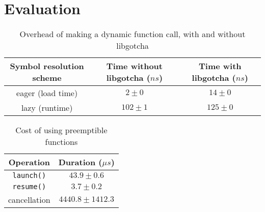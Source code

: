 \section{Evaluation}
\label{sec:eval}

\begin{table*}
\begin{center}
\begin{tabular}{c | c c}
Symbol resolution scheme & Time without libgotcha ($ns$) & Time with libgotcha ($ns$) \\
\hline
eager (load time) & $2 \pm 0$ & $14 \pm 0$ \\
lazy (runtime) & $102 \pm 1$ & $125 \pm 0$
\end{tabular}
\end{center}
\caption{Overhead of making a dynamic function call, with and without libgotcha}
\end{table*}


\begin{table}
\begin{center}
\begin{tabular}{c | c}
Operation & Duration ($\mu{s}$) \\
\hline
\texttt{launch()} & $43.9 \pm 0.6$ \\
\texttt{resume()} & $3.7 \pm 0.2$ \\
cancellation & $4440.8 \pm 1412.3$
\end{tabular}
\end{center}
\caption{Cost of using preemptible functions}
\end{table}


